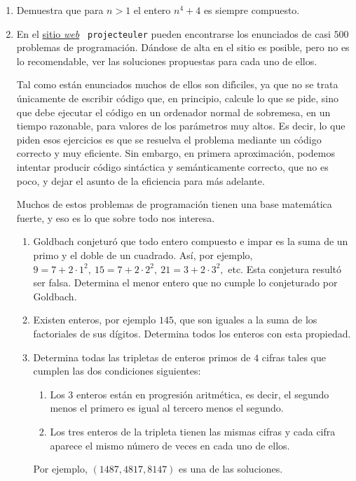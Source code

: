 \begin{enumerate}
\item Demuestra que para $n>1$ el entero $n^4+4$ es siempre compuesto. 





\item En el \href{http://projecteuler.net/}{sitio {\itshape web}} {\tt
projecteuler} pueden encontrarse los enunciados de casi $500$ problemas de
programaci\'on. D\'andose de alta en el sitio es posible, pero no es lo
recomendable,  ver las soluciones
propuestas para cada uno de ellos.  

Tal como est\'an enunciados muchos de ellos son dif\'{\i}ciles, ya que no se
trata \'unicamente de escribir c\'odigo que, en principio, calcule lo que se
pide, sino que debe ejecutar el c\'odigo en un ordenador normal de sobremesa, 
en un tiempo razonable, para valores de los par\'ametros muy altos. Es decir, lo
que piden esos ejercicios es que se resuelva el problema mediante un c\'odigo
correcto y muy eficiente. Sin embargo, en primera aproximaci\'on, podemos
intentar producir c\'odigo sint\'actica y sem\'anticamente correcto, que no es
poco, y dejar el asunto de la eficiencia para m\'as adelante. 

Muchos de estos problemas de programaci\'on tienen una base matem\'atica fuerte,
y eso es lo que sobre todo nos interesa.

\begin{enumerate}

\item Goldbach conjeturó que todo entero compuesto e impar es la suma de un primo y el doble de un cuadrado. Así, por ejemplo, $9=7+2\cdot 1^2,\ 15=7+2\cdot 2^2,\ 21=3+2\cdot 3^2,$ etc. Esta conjetura resultó ser falsa. Determina el menor entero que no cumple lo conjeturado por Goldbach.

\item  Existen enteros, por ejemplo $145$,  que son iguales a la suma de los factoriales de sus dígitos. Determina todos los enteros con esta propiedad. 

\item Determina todas las tripletas de enteros primos de $4$ cifras tales que cumplen las dos condiciones siguientes:
\begin{enumerate}
\item Los $3$ enteros están en progresión aritmética, es decir, el segundo menos el primero es igual al tercero menos el segundo.
\item  Los tres enteros de la tripleta tienen las mismas cifras y cada cifra aparece el mismo número de veces en cada uno de ellos.
\end{enumerate}
Por ejemplo, $(1487, 4817, 8147)$ es una de las soluciones.


\end{enumerate}
\end{enumerate}
